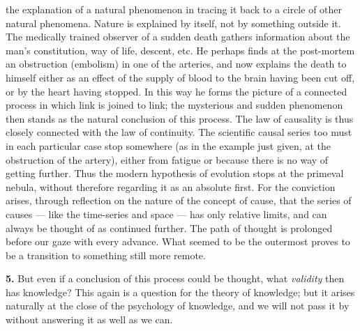 \documentclass[12pt,a4paper]{book}
\newcommand{\opage}[1]{\marginnote{\footnotesize\textit{[#1]}}}
\begin{document}
the explanation of a natural phenomenon in tracing it back to a circle
of
\opage{263}other natural phenomena. Nature is explained by itself, not
by something outside it. The medically trained observer of a sudden
death gathers information about the man's constitution, way of life,
descent, etc. He perhaps finds at the post-mortem an obstruction
(embolism) in one of the arteries, and now explains the death to himself
either as an effect of the supply of blood to the brain having been cut
off, or by the heart having stopped. In this way he forms the picture of
a connected process in which link is joined to link; the mysterious and
sudden phenomenon then stands as the natural conclusion of this process.
The law of causality is thus closely connected with the law of
continuity. The scientific causal series too must in each particular
case stop somewhere (as in the example just given, at the obstruction of
the artery), either from fatigue or because there is no way of getting
further. Thus the modern hypothesis of evolution stops at the primeval
nebula, without therefore regarding it as an absolute first. For the
conviction arises, through reflection on the nature of the concept of
cause, that the series of causes --- like the time-series and space ---
has only relative limits, and can always be thought of as continued
further. The path of thought is prolonged before our gaze with every
advance. What seemed to be the outermost proves to be a transition to
something still more remote.

\textbf{5.} But even if a conclusion of this process could be thought,
what \emph{validity} then has knowledge? This again is a question for the
theory of knowledge; but it arises naturally at the close of the
psychology of knowledge, and we will not pass it by without answering
it as well as we can.
\end{document}
